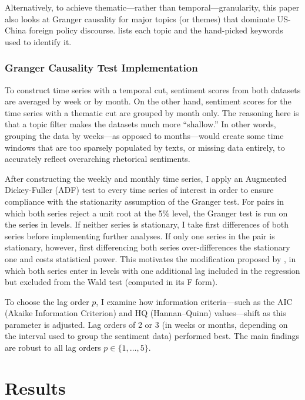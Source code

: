 \documentclass[12pt,letterpaper]{article}
\begin{document}
Alternatively, to achieve thematic---rather than temporal---granularity, this paper also looks at Granger causality for major topics (or themes) that dominate US-China foreign policy discourse.  lists each topic and the hand-picked keywords used to identify it.



\subsubsection*{Granger Causality Test Implementation}

To construct time series with a temporal cut, sentiment scores from both datasets are averaged by week or by month. On the other hand, sentiment scores for the time series with a thematic cut are grouped by month only. The reasoning here is that a topic filter makes the datasets much more ``shallow.'' In other words, grouping the data by weeks---as opposed to months---would create some time windows that are too sparsely populated by texts, or missing data entirely, to accurately reflect overarching rhetorical sentiments.

After constructing the weekly and monthly time series, I apply an Augmented Dickey-Fuller (ADF) test to every time series of interest in order to ensure compliance with the stationarity assumption of the Granger test. For pairs in which both series reject a unit root at the 5\% level, the Granger test is run on the series in levels. If neither series is stationary, I take first differences of both series before implementing further analyses. If only one series in the pair is stationary, however, first differencing both series over-differences the stationary one and costs statistical power. This motivates the modification proposed by \textcite{toda1995}, in which both series enter in levels with one additional lag included in the regression but excluded from the Wald test (computed in its F form).

To choose the lag order $p$, I examine how information criteria---such as the AIC (Akaike Information Criterion) and HQ (Hannan--Quinn) values---shift as this parameter is adjusted. Lag orders of 2 or 3 (in weeks or months, depending on the interval used to group the sentiment data) performed best. The main findings are robust to all lag orders $p \in \{1,\dots,5\}$.

\section{Results}
\label{sec:results}
\end{document}
